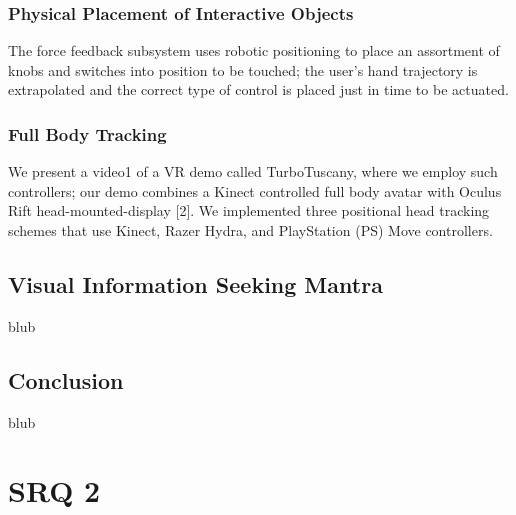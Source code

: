 \subsubsection{Physical Placement of Interactive Objects}

The force feedback subsystem uses robotic positioning to place an assortment of knobs and switches into position to be touched; the user's hand trajectory is extrapolated and the correct type of control is placed just in time to be actuated.
\cite{Latham1997}


\subsubsection{Full Body Tracking}

We present a video1 of a VR demo called TurboTuscany, where we employ such controllers; our demo combines a Kinect controlled full body avatar with Oculus Rift head-mounted-display [2]. We implemented three positional head tracking schemes that use Kinect, Razer Hydra, and PlayStation (PS) Move controllers.
\cite{Takala2014}










\subsection{Visual Information Seeking Mantra}

blub




\subsection{Conclusion}

blub




\section{SRQ 2}

